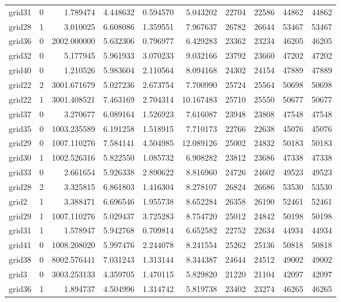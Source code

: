 \begin{longtable}{|l|r|r|r|r|r|r|r|r|r|}
grid31 & 0 & 1.789474 & 4.448632 & 0.594570 & 5.043202 & 22704 & 22586 & 44862 & 44862 \\
grid28 & 1 & 3.010025 & 6.608086 & 1.359551 & 7.967637 & 26782 & 26644 & 53467 & 53467 \\
grid36 & 0 & 2002.000000 & 5.632306 & 0.796977 & 6.429283 & 23362 & 23234 & 46205 & 46205 \\
grid32 & 0 & 5.177945 & 5.961933 & 3.070233 & 9.032166 & 23792 & 23660 & 47202 & 47202 \\
grid40 & 0 & 1.210526 & 5.983604 & 2.110564 & 8.094168 & 24302 & 24154 & 47889 & 47889 \\
grid22 & 2 & 3001.671679 & 5.027236 & 2.673754 & 7.700990 & 25724 & 25564 & 50698 & 50698 \\
grid22 & 1 & 3001.408521 & 7.463169 & 2.704314 & 10.167483 & 25710 & 25550 & 50677 & 50677 \\
grid37 & 0 & 3.270677 & 6.089164 & 1.526923 & 7.616087 & 23948 & 23808 & 47548 & 47548 \\
grid35 & 0 & 1003.235589 & 6.191258 & 1.518915 & 7.710173 & 22766 & 22638 & 45076 & 45076 \\
grid29 & 0 & 1007.110276 & 7.584141 & 4.504985 & 12.089126 & 25002 & 24832 & 50183 & 50183 \\
grid30 & 1 & 1002.526316 & 5.822550 & 1.085732 & 6.908282 & 23812 & 23686 & 47338 & 47338 \\
grid33 & 0 & 2.661654 & 5.926338 & 2.890622 & 8.816960 & 24726 & 24602 & 49523 & 49523 \\
grid28 & 2 & 3.325815 & 6.861803 & 1.416304 & 8.278107 & 26824 & 26686 & 53530 & 53530 \\
grid2 & 1 & 3.388471 & 6.696546 & 1.955738 & 8.652284 & 26358 & 26190 & 52461 & 52461 \\
grid29 & 1 & 1007.110276 & 5.029437 & 3.725283 & 8.754720 & 25012 & 24842 & 50198 & 50198 \\
grid31 & 1 & 1.578947 & 5.942768 & 0.709814 & 6.652582 & 22752 & 22634 & 44934 & 44934 \\
grid41 & 0 & 1008.208020 & 5.997476 & 2.244078 & 8.241554 & 25262 & 25136 & 50818 & 50818 \\
grid38 & 0 & 8002.576441 & 7.031243 & 1.313144 & 8.344387 & 24644 & 24512 & 49002 & 49002 \\
grid3 & 0 & 3003.253133 & 4.359705 & 1.470115 & 5.829820 & 21220 & 21104 & 42097 & 42097 \\
grid36 & 1 & 1.894737 & 4.504996 & 1.314742 & 5.819738 & 23402 & 23274 & 46265 & 46265 \\

\end{longtable}
